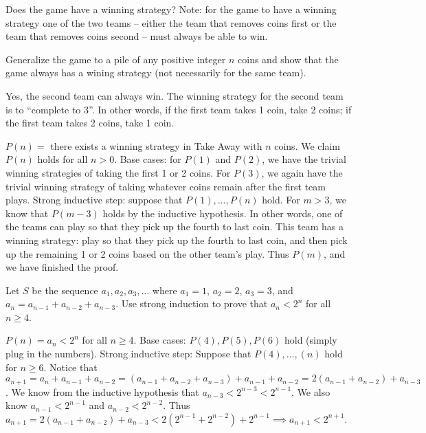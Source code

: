 \documentclass[solution, letterpaper]{cs20inclass}
\begin{document}
\subproblem Does the game have a winning strategy? Note: for the game to have a winning strategy one of the two teams -- either the team that removes coins first or the team that removes coins second -- must always be able to win. 

\subproblem Generalize the game to a pile of any positive integer $n$ coins and show that the game always has a wining strategy (not necessarily for the same team).

\begin{solution}

\subsolution Yes, the second team can always win. The winning strategy for the second team is to ``complete to 3''. In other words, if the first team takes 1 coin, take 2 coins; if the first team takes 2 coins, take 1 coin.

\subsolution $P(n) = $ there exists a winning strategy in Take Away with $n$ coins. We claim $P(n)$ holds for all $n > 0$. Base cases: for $P(1)$ and $P(2)$, we have the trivial winning strategies of taking the first 1 or 2 coins. For $P(3)$, we again have the trivial winning strategy of taking whatever coins remain after the first team plays. Strong inductive step: suppose that $P(1), ..., P(n)$ hold. For $m > 3$, we know that $P(m-3)$ holds by the inductive hypothesis. In other words, one of the teams can play so that they pick up the fourth to last coin. This team has a winning strategy: play so that they pick up the fourth to last coin, and then pick up the remaining 1 or 2 coins based on the other team's play. Thus $P(m)$, and we have finished the proof.
  
\end{solution}

\problem

Let $S$ be the sequence $a_1, a_2, a_3, \ldots$ where $a_1 = 1$, $a_2 = 2$, $a_3 = 3$, and $a_n = a_{n-1} + a_{n-2} + a_{n-3}$. Use strong induction to prove that $a_n < 2^n$ for all $n \geq 4$.

\begin{solution}

$P(n) = a_n < 2^n$ for all $n \geq 4$. Base cases: $P(4), P(5), P(6)$ hold (simply plug in the numbers). Strong inductive step: Suppose that $P(4), ..., (n)$ hold for $n \geq 6$. Notice that $a_{n+1} = a_n + a_{n-1} + a_{n-2} = (a_{n-1} + a_{n-2} + a_{n-3}) + a_{n-1} + a_{n-2} = 2(a_{n-1}+a_{n-2}) + a_{n-3}$. We know from the inductive hypothesis that $a_{n-3} < 2^{n-3} < 2^{n-1}$. We also know $a_{n-1} < 2^{n-1}$ and $a_{n-2} < 2^{n-2}$. Thus $a_{n+1} =  2(a_{n-1}+a_{n-2}) + a_{n-3} < 2(2^{n-1} + 2^{n-2}) + 2^{n-1} \implies a_{n+1} <2^{n+1}$.

\end{solution}
\end{document}
